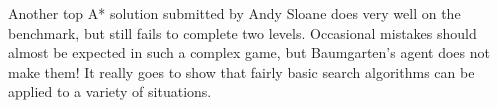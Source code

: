 \documentclass[12pt]{article}
\begin{document}
\begin{multicols*}{2}
Another  top A* solution submitted by Andy Sloane does very well on the benchmark, 
but still fails to complete 
two levels.  Occasional mistakes should almost be expected in such a complex game, but 
Baumgarten's agent does not make them!  It really goes to show that fairly basic search algorithms 
can be applied to a variety of situations.

\end{multicols*}
\end{document}
